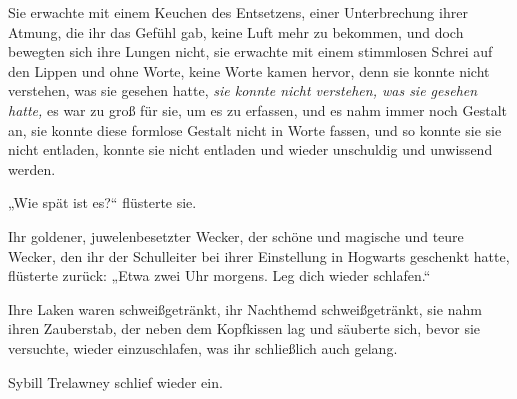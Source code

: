 Sie erwachte mit einem Keuchen des Entsetzens, einer Unterbrechung ihrer Atmung, die ihr das Gefühl gab, keine Luft mehr zu bekommen, und doch bewegten sich ihre Lungen nicht, sie erwachte mit einem stimmlosen Schrei auf den Lippen und ohne Worte, keine Worte kamen hervor, denn sie konnte nicht verstehen, was sie gesehen hatte, \emph{sie konnte nicht verstehen, was sie gesehen hatte,} es war zu groß für sie, um es zu erfassen, und es nahm immer noch Gestalt an, sie konnte diese formlose Gestalt nicht in Worte fassen, und so konnte sie sie nicht entladen, konnte sie nicht entladen und wieder unschuldig und unwissend werden.

„Wie spät ist es?“ flüsterte sie.

Ihr goldener, juwelenbesetzter Wecker, der schöne und magische und teure Wecker, den ihr der Schulleiter bei ihrer Einstellung in Hogwarts geschenkt hatte, flüsterte zurück:
„Etwa zwei Uhr morgens. Leg dich wieder schlafen.“

Ihre Laken waren schweißgetränkt, ihr Nachthemd schweißgetränkt, sie nahm ihren Zauberstab, der neben dem Kopfkissen lag und säuberte sich, bevor sie versuchte, wieder einzuschlafen, was ihr schließlich auch gelang.

Sybill Trelawney schlief wieder ein.

